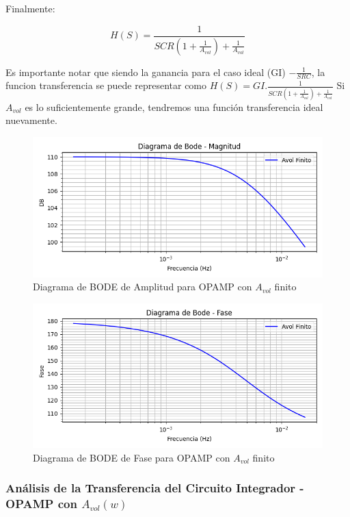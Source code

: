 Finalmente:

$$H(S)= \frac{1}{SCR(1+\frac{1}{A_{vol}})+\frac{1}{A_{vol}}}$$

Es importante notar que siendo la ganancia para el caso ideal (GI) $- \frac{1}{SRC}$,  la funcion
transferencia se puede representar como $H(S) = GI. \frac{1}{SCR(1+\frac{1}{A_{vol}})+\frac{1}{A_{vol}}}$
Si $A_{vol}$ es lo suficientemente grande, tendremos una función transferencia ideal nuevamente.

\begin{figure}[H]
    \centering 
    \includegraphics [scale=1] {../Ejercicio3-CircuitoIntegradoresyDerivadores/Imagenes/diagrama-bode-cideal-amplitud.png} 
    \caption{Diagrama de BODE de Amplitud para OPAMP con $A_{vol}$ finito}
    \label{fig:emptyPlotTool}
\end{figure}

\begin{figure}[H]
    \centering 
    \includegraphics [scale=1] {../Ejercicio3-CircuitoIntegradoresyDerivadores/Imagenes/diagrama-bode-cideal-fase.png} 
    \caption{Diagrama de BODE de Fase para OPAMP con $A_{vol}$ finito}
    \label{fig:emptyPlotTool}
\end{figure}

\subsubsection{Análisis de la Transferencia del Circuito Integrador - OPAMP con $A_{vol}(w)$}

